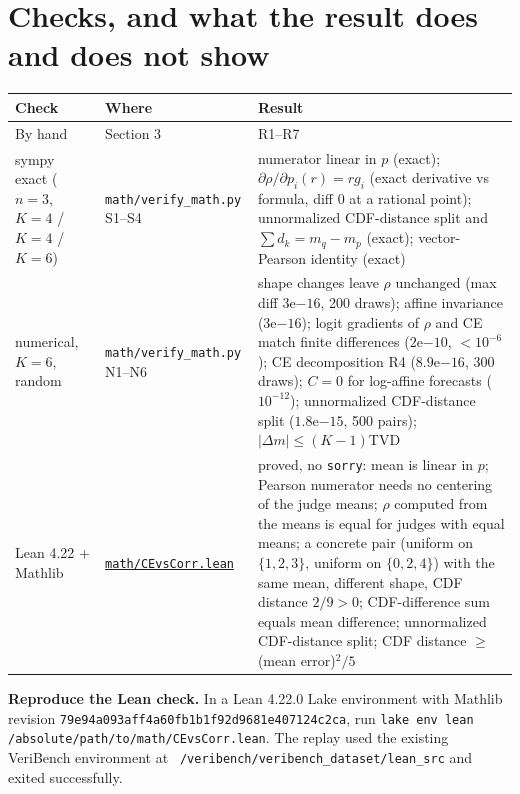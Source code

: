 \documentclass[11pt]{article}
\begin{document}
\section{Checks, and what the result does and does not show}
\small\sloppy\renewcommand{\arraystretch}{1.3}
\begin{tabularx}{\textwidth}{@{}>{\raggedright\arraybackslash}p{2.6cm}>{\raggedright\arraybackslash}p{3.6cm}>{\raggedright\arraybackslash}X@{}}
\toprule
\textbf{Check} & \textbf{Where} & \textbf{Result}\\
\midrule
By hand & Section 3 & R1--R7\\
sympy exact ($n=3$, $K=4$ / $K=4$ / $K=6$) & \texttt{math/\allowbreak verify\_math.py} S1--S4 & numerator linear in $p$ (exact); $\partial\rho/\partial p_i(r)=r g_i$ (exact derivative vs formula, diff 0 at a rational point); unnormalized CDF-distance split and $\sum d_k=m_q-m_p$ (exact); vector-Pearson identity (exact)\\
numerical, $K=6$, random & \texttt{math/\allowbreak verify\_math.py} N1--N6 & shape changes leave $\rho$ unchanged (max diff $3\mathrm{e}{-16}$, 200 draws); affine invariance ($3\mathrm{e}{-16}$); logit gradients of $\rho$ and CE match finite differences ($2\mathrm{e}{-10}$, $<10^{-6}$); CE decomposition R4 ($8.9\mathrm{e}{-16}$, 300 draws); $C=0$ for log-affine forecasts ($10^{-12}$); unnormalized CDF-distance split ($1.8\mathrm{e}{-15}$, 500 pairs); $\lvert\Delta m\rvert\le(K-1)$TVD\\
Lean 4.22 + Mathlib & \href{https://github.com/brando90/judges-dont-need-psychometrics-or-corr/blob/main/experiments/18_when_does_ce_beat_correlation_notebook_page_math_and_sweep_start_21Nov2026/math/CEvsCorr.lean}{\texttt{math/CEvsCorr.lean}} & proved, no \texttt{sorry}: mean is linear in $p$; Pearson numerator needs no centering of the judge means; $\rho$ computed from the means is equal for judges with equal means; a concrete pair (uniform on $\{1,2,3\}$, uniform on $\{0,2,4\}$) with the same mean, different shape, CDF distance $2/9>0$; CDF-difference sum equals mean difference; unnormalized CDF-distance split; CDF distance $\ge$ (mean error)$^2/5$\\
\bottomrule
\end{tabularx}

\normalsize{\raggedright\textbf{Reproduce the Lean check.} In a Lean 4.22.0 Lake environment with Mathlib revision \texttt{79e94a093aff4a60fb1b1f92d9681e407124c2ca}, run \texttt{lake env lean /absolute/path/to/math/CEvsCorr.lean}. The replay used the existing VeriBench environment at \texttt{\string~/veribench/veribench\_dataset/lean\_src} and exited successfully.\par}
\end{document}
